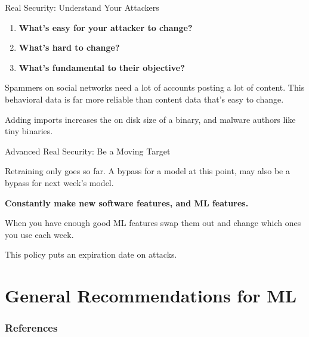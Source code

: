 \documentclass{beamer}
\begin{document}
\begin{frame}{Real Security: Understand Your Attackers}
    \begin{center}
        \begin{enumerate}
            \item \textbf{What's easy for your attacker to change?}
            \item \textbf{What's hard to change?}
            \item \textbf{What's fundamental to their objective?}
        \end{enumerate}
        \vspace{20pt}

        Spammers on social networks need a lot of accounts posting a lot of content. This behavioral data is far more reliable than content data that's easy to change.
        \vspace{10pt}
        
        Adding imports increases the on disk size of a binary, and malware authors like tiny binaries.
    \end{center}
\end{frame}

\begin{frame}{Advanced Real Security: Be a Moving Target}
    \begin{center}
        Retraining only goes so far. A bypass for a model at this point, may also be a bypass for next week's model.
        \vspace{10pt}
        
        \textbf{Constantly make new software features, and ML features.}  
        \vspace{10pt}

        When you have enough good ML features swap them out and change which ones you use each week. 
        \vspace{10pt}
        
        This policy puts an expiration date on attacks. \cite{proofpoint_cve}
    \end{center}
\end{frame}

\section{General Recommendations for ML}



\begin{frame}[t, allowframebreaks]
\frametitle{References}


\end{frame}
\end{document}
